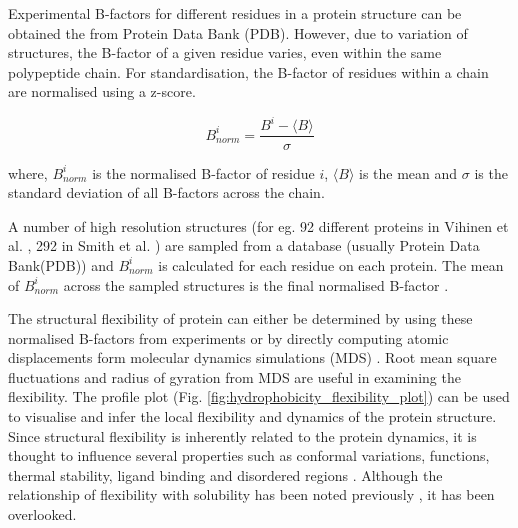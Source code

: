 Experimental B-factors for different residues in a protein structure can be obtained the from Protein Data Bank (PDB). However, due to variation of structures, the B-factor of a given residue varies, even within the same polypeptide chain. For standardisation, the B-factor of residues within a chain are normalised using a z-score.

\begin{equation}
    B_{norm}^i =  \frac{B^i - \langle B\rangle}{\sigma}
\end{equation}

where, $B_{norm}^i$ is the normalised B-factor of residue $i$, $\langle B\rangle$ is the mean and $\sigma$ is the standard deviation of all B-factors across the chain.



A number of high resolution structures (for eg. 92 different proteins in Vihinen et al. \cite{vihinen1994accuracy}, 292 in Smith et al. \cite{Smith2003-gb}) are sampled from a database (usually Protein Data Bank(PDB)) and $B_{norm}^i$ is calculated for each residue on each protein. The mean of $B_{norm}^i$ across the sampled structures is the final normalised B-factor \cite{Schlessinger2005-ps, Smith2003-gb, Karplus1985-ea, vihinen1994accuracy}. 


The structural flexibility of protein can either be determined by using these normalised B-factors from experiments or by directly computing atomic displacements form molecular dynamics simulations (MDS) 
\cite{dong2018structural, kufareva2011methods}. Root mean square fluctuations and radius of gyration from MDS are useful in examining the flexibility. The profile plot (Fig. \ref{fig:hydrophobicity_flexibility_plot}) can be used to visualise and infer the local flexibility and dynamics of the protein structure. Since structural flexibility is inherently related to the protein dynamics, it is thought to influence several properties such as conformal variations, functions, thermal stability, ligand binding and disordered regions  \cite{Vihinen1987-jo, Teague2003-vq, Ma2005-cr, Yuan2005-gl, Yin2011-su, amaral2017protein}. Although the relationship of flexibility with solubility has been noted previously \cite{Tsumoto2003-qp}, it has been overlooked. 


